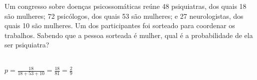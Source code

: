 \begin{ex}
Um congresso sobre doenças psicossomáticas reúne 48 psiquiatras, dos quais 18 são mulheres; 72 psicólogos, dos quais 53 são mulheres; e 27 neurologistas, dos quais 10 são mulheres. Um dos participantes foi sorteado para coordenar os trabalhos. Sabendo que a pessoa sorteada é mulher, qual é a probabilidade de ela ser psiquiatra?
  \begin{sol}
   \phantom{A} \\
   $p=\frac{18}{18+53+10}=\frac{18}{81}=\frac{2}{9}$
  \end{sol}
\end{ex}